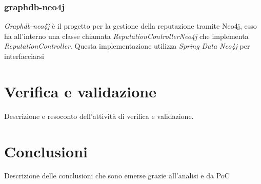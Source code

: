 \subsubsection{graphdb-neo4j}
\textit{Graphdb-neo4j}́ è il progetto per la gestione della reputazione tramite Neo4j, esso ha all'interno una classe chiamata \textit{ReputationControllerNeo4j} che implementa \textit{ReputationController}. Questa implementazione utilizza \textit{Spring Data Neo4j} per interfacciarsi 



\section{Verifica e validazione}
Descrizione e resoconto dell'attività di verifica e validazione.

\section{Conclusioni}

Descrizione delle conclusioni che sono emerse grazie all'analisi e da PoC

